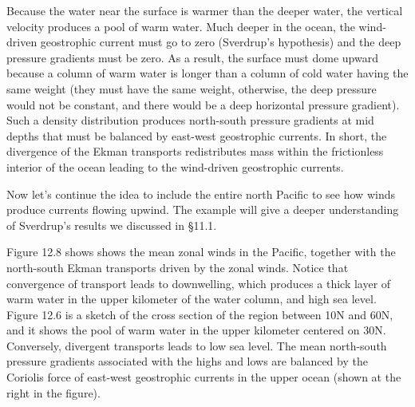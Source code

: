 Because the water near the surface is warmer than the deeper water,
the vertical velocity produces a pool of warm water. Much deeper in
the ocean, the wind-driven geostrophic current must go to zero
(Sverdrup's hypothesis) and the deep pressure gradients must be
zero. As a result, the surface must dome upward because a column of
warm water is longer than a column of cold water having the same
weight (they must have the same weight, otherwise, the deep pressure
would not be constant, and there would be a deep horizontal pressure
gradient). Such a density distribution produces north-south pressure
gradients at mid depths that must be balanced by east-west geostrophic
currents. In short, the divergence of the Ekman
transports redistributes mass within the
frictionless interior of the ocean leading to the wind-driven
geostrophic currents.

Now let's continue the idea to include the entire north Pacific to see
how winds produce currents flowing upwind. The example will give a
deeper understanding of Sverdrup's results we discussed in \S11.1.

Figure 12.8 shows shows the mean zonal winds in the Pacific, together
with the north-south Ekman transports
driven by the zonal winds. Notice that convergence of
transport leads to downwelling, which
produces a thick layer of warm water in the upper kilometer of the
water column, and high sea level.  Figure 12.6 is a sketch of the
cross section of the region between 10\degrees N and 60\degrees N, and
it shows the pool of warm water in the upper kilometer centered on
30\degrees N.  Conversely, divergent transports leads to low sea
level. The mean north-south pressure gradients associated with the
highs and lows are balanced by the Coriolis force of east-west
geostrophic currents in the
upper ocean (shown at the right in the figure).


